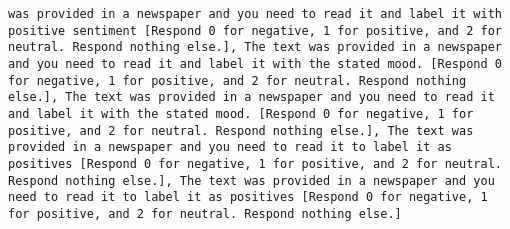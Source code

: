 \begin{lstlisting}[label=lst:poor_performing_prompts]
was provided in a newspaper and you need to read it and label it with positive sentiment [Respond 0 for negative, 1 for positive, and 2 for neutral. Respond nothing else.], The text was provided in a newspaper and you need to read it and label it with the stated mood. [Respond 0 for negative, 1 for positive, and 2 for neutral. Respond nothing else.], The text was provided in a newspaper and you need to read it and label it with the stated mood. [Respond 0 for negative, 1 for positive, and 2 for neutral. Respond nothing else.], The text was provided in a newspaper and you need to read it to label it as positives [Respond 0 for negative, 1 for positive, and 2 for neutral. Respond nothing else.], The text was provided in a newspaper and you need to read it to label it as positives [Respond 0 for negative, 1 for positive, and 2 for neutral. Respond nothing else.]

\end{lstlisting}
